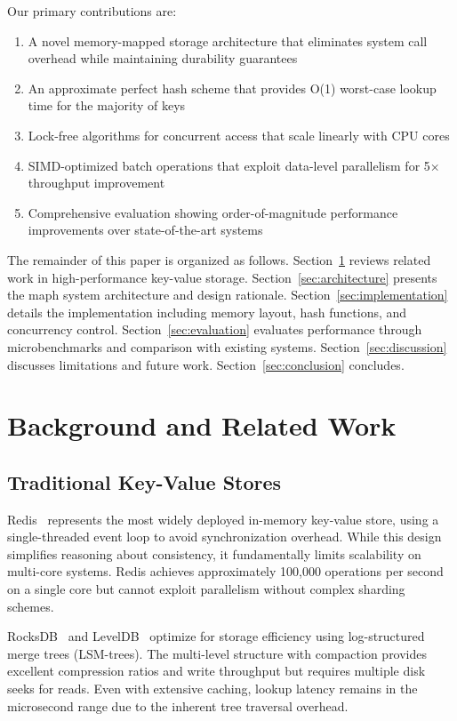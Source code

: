 \documentclass[11pt]{article}
\begin{document}
Our primary contributions are:

\begin{enumerate}
\item A novel memory-mapped storage architecture that eliminates system call overhead while maintaining durability guarantees
\item An approximate perfect hash scheme that provides O(1) worst-case lookup time for the majority of keys
\item Lock-free algorithms for concurrent access that scale linearly with CPU cores
\item SIMD-optimized batch operations that exploit data-level parallelism for 5× throughput improvement
\item Comprehensive evaluation showing order-of-magnitude performance improvements over state-of-the-art systems
\end{enumerate}

The remainder of this paper is organized as follows. Section~\ref{sec:background} reviews related work in high-performance key-value storage. Section~\ref{sec:architecture} presents the maph system architecture and design rationale. Section~\ref{sec:implementation} details the implementation including memory layout, hash functions, and concurrency control. Section~\ref{sec:evaluation} evaluates performance through microbenchmarks and comparison with existing systems. Section~\ref{sec:discussion} discusses limitations and future work. Section~\ref{sec:conclusion} concludes.

\section{Background and Related Work}
\label{sec:background}

\subsection{Traditional Key-Value Stores}

Redis~\cite{redis} represents the most widely deployed in-memory key-value store, using a single-threaded event loop to avoid synchronization overhead. While this design simplifies reasoning about consistency, it fundamentally limits scalability on multi-core systems. Redis achieves approximately 100,000 operations per second on a single core but cannot exploit parallelism without complex sharding schemes.

RocksDB~\cite{rocksdb} and LevelDB~\cite{leveldb} optimize for storage efficiency using log-structured merge trees (LSM-trees). The multi-level structure with compaction provides excellent compression ratios and write throughput but requires multiple disk seeks for reads. Even with extensive caching, lookup latency remains in the microsecond range due to the inherent tree traversal overhead.
\end{document}
